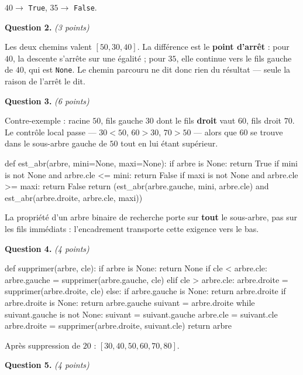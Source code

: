 $40 \rightarrow$ \lstinline{True}, $35 \rightarrow$ \lstinline{False}.

\medskip
\textbf{Question 2.} \emph{(3 points)}

Les deux chemins valent $[50, 30, 40]$. La différence est le \textbf{point
d'arrêt} : pour $40$, la descente s'arrête sur une égalité ; pour $35$, elle
continue vers le fils gauche de $40$, qui est \lstinline{None}. Le chemin
parcouru ne dit donc rien du résultat — seule la raison de l'arrêt le dit.

\medskip
\textbf{Question 3.} \emph{(6 points)}

Contre-exemple : racine $50$, fils gauche $30$ dont le fils \textbf{droit} vaut
$60$, fils droit $70$. Le contrôle local passe — $30 < 50$, $60 > 30$,
$70 > 50$ — alors que $60$ se trouve dans le sous-arbre gauche de $50$ tout en
lui étant supérieur.

\begin{python}
def est_abr(arbre, mini=None, maxi=None):
    if arbre is None:
        return True
    if mini is not None and arbre.cle <= mini:
        return False
    if maxi is not None and arbre.cle >= maxi:
        return False
    return (est_abr(arbre.gauche, mini, arbre.cle)
            and est_abr(arbre.droite, arbre.cle, maxi))
\end{python}

La propriété d'un arbre binaire de recherche porte sur \textbf{tout} le
sous-arbre, pas sur les fils immédiats : l'encadrement transporte cette
exigence vers le bas.

\medskip
\textbf{Question 4.} \emph{(4 points)}

\begin{python}
def supprimer(arbre, cle):
    if arbre is None:
        return None
    if cle < arbre.cle:
        arbre.gauche = supprimer(arbre.gauche, cle)
    elif cle > arbre.cle:
        arbre.droite = supprimer(arbre.droite, cle)
    else:
        if arbre.gauche is None:
            return arbre.droite
        if arbre.droite is None:
            return arbre.gauche
        suivant = arbre.droite
        while suivant.gauche is not None:
            suivant = suivant.gauche
        arbre.cle = suivant.cle
        arbre.droite = supprimer(arbre.droite, suivant.cle)
    return arbre
\end{python}

Après suppression de $20$ : $[30, 40, 50, 60, 70, 80]$.

\medskip
\textbf{Question 5.} \emph{(4 points)}

